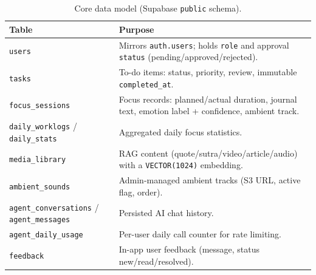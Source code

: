 \documentclass[a4paper,11pt]{article}
\begin{document}
	\begin{table}[H]
		\centering
		\footnotesize
		\begin{tabularx}{\textwidth}{@{}p{3.6cm} X@{}}
			\toprule
			\textbf{Table} & \textbf{Purpose} \\
			\midrule
			\texttt{users} & Mirrors \texttt{auth.users}; holds \texttt{role} and approval \texttt{status} (pending/approved/rejected). \\
			\texttt{tasks} & To-do items: status, priority, review, immutable \texttt{completed\_at}. \\
			\texttt{focus\_sessions} & Focus records: planned/actual duration, journal text, emotion label + confidence, ambient track. \\
			\texttt{daily\_worklogs} / \texttt{daily\_stats} & Aggregated daily focus statistics. \\
			\texttt{media\_library} & RAG content (quote/sutra/video/article/audio) with a \texttt{VECTOR(1024)} embedding. \\
			\texttt{ambient\_sounds} & Admin-managed ambient tracks (S3 URL, active flag, order). \\
			\texttt{agent\_conversations} / \texttt{agent\_messages} & Persisted AI chat history. \\
			\texttt{agent\_daily\_usage} & Per-user daily call counter for rate limiting. \\
			\texttt{feedback} & In-app user feedback (message, status new/read/resolved). \\
			\bottomrule
		\end{tabularx}
		\caption{Core data model (Supabase \texttt{public} schema).}
		\label{tab:datamodel}
	\end{table}
\end{document}
